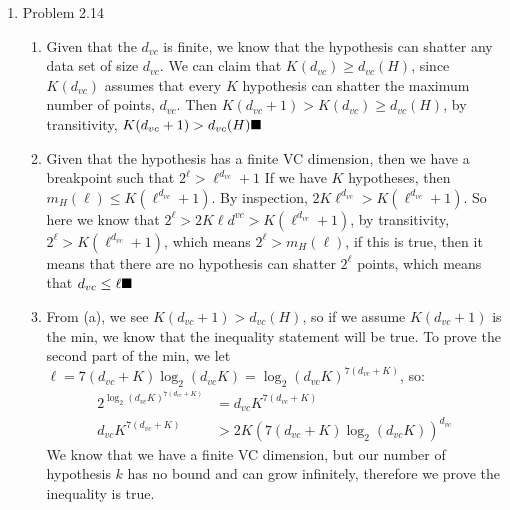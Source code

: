 \documentclass{article}
\begin{document}
\begin{enumerate}
        \item Problem 2.14
        \begin{enumerate}
            \item Given that the $d_{vc}$ is finite, we know that the hypothesis can shatter any data set of size $d_{vc}$. We can claim that $K(d_{vc}) \geq d_{vc}(H)$, since $K(d_{vc})$ assumes that every $K$ hypothesis can shatter the maximum number of points, $d_{vc}$. Then $K(d_{vc} + 1) > K(d_{vc}) \geq d_{vc}(H)$, by transitivity, $K(d_{vc} + 1) > d_{vc}(H) \hfill \blacksquare$
            \item Given that the hypothesis has a finite VC dimension, then we have a breakpoint such that $2^\ell > \ell^{d_{vc}} + 1$ If we have $K$ hypotheses, then $m_H(\ell) \leq K(\ell^{d_{vc}}+1)$. By inspection, $2K\ell^{d_{vc}} > K(\ell^{d_{vc}} + 1)$. So here we know that $2^\ell > 2K\ell d^{vc} > K(\ell ^{d_{vc}} + 1)$, by transitivity, $2^\ell > K(\ell ^{d_{vc}} + 1)$, which means $2^\ell > m_H(\ell)$, if this is true, then it means that there are no hypothesis can shatter $2^\ell$ points, which means that $d_{vc} \leq \ell \hfill \blacksquare$
            \item From (a), we see $K(d_{vc} + 1) > d_{vc}(H)$, so if we assume $K(d_{vc} + 1)$ is the min, we know that the inequality statement will be true. To prove the second part of the min, we let $\ell = 7 (d_{vc} + K)\log_2(d_{vc}K) = \log_2(d_{vc}K)^{7(d_{vc}+K)}$, so:
            \begin{align*}
                2^{\log_2(d_{vc}K)^{7(d_{vc}+K)}} &= d_{vc}K^{7(d_{vc} + K)}\\
                d_{vc}K^{7(d_{vc} + K)} &> 2K(7(d_{vc}+K)\log_2(d_{vc}K))^{d_{vc}}
            \end{align*}
            We know that we have a finite VC dimension, but our number of hypothesis $k$ has no bound and can grow infinitely, therefore we prove the inequality is true.
        \end{enumerate}


\end{enumerate}
\end{document}
